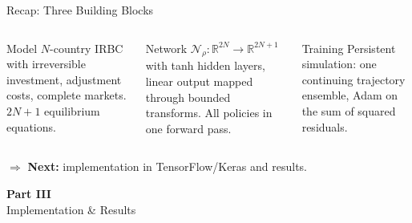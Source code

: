 \documentclass[aspectratio=169,11pt]{beamer}
\newcommand{\R}{\mathbb{R}}
\begin{document}
\begin{frame}{Recap: Three Building Blocks}
\begin{columns}[T]
\begin{block}{Model}
\centering
\small
$N$-country IRBC with irreversible investment, adjustment costs, complete markets. $2N+1$ equilibrium equations.
\end{block}

\begin{block}{Network}
\centering
\small
$\mathcal{N}_\rho: \R^{2N} \to \R^{2N+1}$ with tanh hidden layers, linear output mapped through bounded transforms. All policies in one forward pass.
\end{block}

\begin{block}{Training}
\centering
\small
Persistent simulation: one continuing trajectory ensemble, Adam on the sum of squared residuals.
\end{block}
\end{columns}

\vspace{0.8em}
\begin{center}
$\Rightarrow$ \textbf{Next:} implementation in TensorFlow/Keras and results.
\end{center}
\end{frame}


\begin{frame}{}
\vfill
\begin{center}
{\Huge \textcolor{uzhblue}{\textbf{Part III}}}\\[12pt]
{\LARGE Implementation \& Results}
\end{center}
\vfill
\end{frame}
\end{document}
